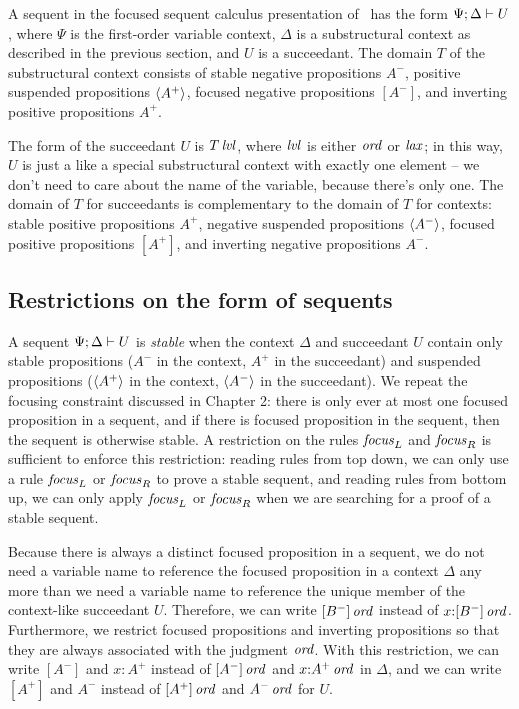 A sequent in the focused sequent calculus presentation of \ollll~has
the form ${\Psi};{\Delta} \vdash {U}$, where $\Psi$ is the first-order
variable context, $\Delta$ is a substructural context as described in
the previous section, and $U$ is a succeedant. The domain $T$ of the
substructural context consists of stable negative propositions $A^-$,
positive suspended propositions $\langle {A^+} \rangle$, focused negative
propositions $[A^-]$, and inverting positive propositions $A^+$.

The form of the succeedant $U$ is ${T}\,{{\it lvl}}$, where ${\it lvl}$ is either
${\it ord}$ or ${\it lax}$; in this way, $U$ is just a like a special
substructural context with exactly one element -- we don't need
to care about the name of the variable, because there's only one.  The
domain of $T$ for succeedants is complementary to the domain of $T$
for contexts: stable positive propositions $A^+$, negative suspended
propositions $\langle {A^-} \rangle$, focused positive propositions $[A^+]$, and
inverting negative propositions $A^-$.

\subsection{Restrictions on the form of sequents}

A sequent ${\Psi};{\Delta} \vdash {U}$ is {\it stable} when the context
$\Delta$ and succeedant $U$ contain only stable propositions ($A^-$ in
the context, $A^+$ in the succeedant) and suspended propositions
($\langle {A^+} \rangle$ in the context, $\langle {A^-} \rangle$ in the succeedant). We
repeat the focusing constraint discussed in Chapter 2: there is only
ever at most one focused proposition in a sequent, and if there is
focused proposition in the sequent, then the sequent is otherwise
stable. A restriction on the rules ${\it focus}_L$ and ${\it focus}_R$
is sufficient to enforce this restriction: reading rules from
top down, we can only use a rule ${\it focus}_L$ or ${\it focus}_R$ to
prove a stable sequent, and reading rules from bottom up, we can only
apply ${\it focus}_L$ or ${\it focus}_R$ when we are searching for a
proof of a stable sequent.

Because there is always a distinct focused proposition in a sequent,
we do not need a variable name to reference the focused proposition in
a context $\Delta$ any more than we need a variable name to reference
the unique member of the context-like succeedant $U$. Therefore, we
can write ${[B^-]}\,{{\it ord}}$ instead of $x{:}{[B^-]}\,{{\it ord}}$. Furthermore,
we restrict focused propositions and inverting propositions so that
they are always associated with the judgment ${\it ord}$. With this
restriction, we can write $[A^-]$ and $x{:}A^+$ instead of
${[A^-]}\,{{\it ord}}$ and $x{:}{A^+}\,{{\it ord}}$ in $\Delta$, and we can write
$[A^+]$ and $A^-$ instead of ${[A^+]}\,{{\it ord}}$ and ${A^-}\,{{\it ord}}$ for
$U$.

